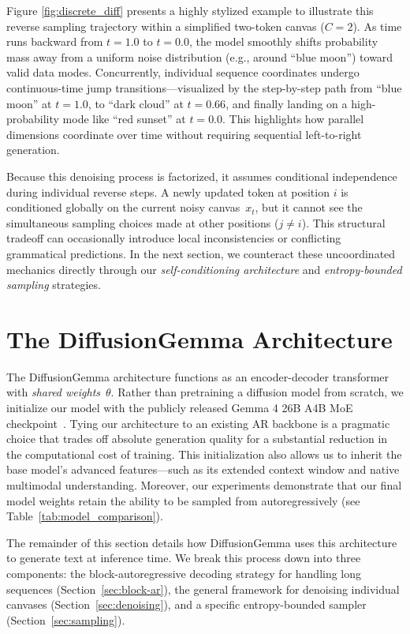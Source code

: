 \documentclass[11pt, a4paper, logo, copyright, gdm]{google}
\begin{document}
Figure \ref{fig:discrete_diff} presents a highly stylized example to illustrate this reverse sampling trajectory within a simplified two-token canvas ($C=2$). As time runs backward from $t=1.0$ to $t=0.0$, the model smoothly shifts probability mass away from a uniform noise distribution (e.g., around ``blue moon'') toward valid data modes. Concurrently, individual sequence coordinates undergo continuous-time jump transitions---visualized by the step-by-step path from ``blue moon'' at $t=1.0$, to ``dark cloud'' at $t=0.66$, and finally landing on a high-probability mode like ``red sunset'' at $t=0.0$. This highlights how parallel dimensions coordinate over time without requiring sequential left-to-right generation.

Because this denoising process is factorized, it assumes conditional independence during individual reverse steps. A newly updated token at position $i$ is conditioned globally on the current noisy canvas~$x_t$, but it cannot see the simultaneous sampling choices made at other positions ($j \neq i$). This structural tradeoff can occasionally introduce local inconsistencies or conflicting grammatical predictions. In the next section, we counteract these uncoordinated mechanics directly through our \emph{self-conditioning architecture} and \emph{entropy-bounded sampling} strategies.


\section{The DiffusionGemma Architecture} \label{sec:architecture}

The DiffusionGemma architecture functions as an encoder-decoder transformer \citep{Vaswani2017} with \emph{shared weights}~$\theta$. Rather than pretraining a diffusion model from scratch, we initialize our model with the publicly released Gemma 4 26B A4B MoE checkpoint~\citep{gemmateam2026gemma4technicalreport}. Tying our architecture to an existing AR backbone is a pragmatic choice that trades off absolute generation quality for a substantial reduction in the computational cost of training. This initialization also allows us to inherit the base model's advanced features---such as its extended context window and native multimodal understanding. Moreover, our experiments demonstrate that our final model weights retain the ability to be sampled from autoregressively (see Table~\ref{tab:model_comparison}).

The remainder of this section details how DiffusionGemma uses this architecture to generate text at inference time. We break this process down into three components: the block-autoregressive decoding strategy for handling long sequences (Section~\ref{sec:block-ar}), the general framework for denoising individual canvases (Section~\ref{sec:denoising}), and a specific entropy-bounded sampler (Section~\ref{sec:sampling}).
\end{document}
